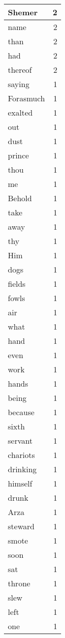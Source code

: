 \begin{center}
\begin{longtable}{l|r}
Shemer & 2\\ \hline 
name & 2\\ \hline 
than & 2\\ \hline 
had & 2\\ \hline 
thereof & 2\\ \hline 
saying & 1\\ \hline 
Forasmuch & 1\\ \hline 
exalted & 1\\ \hline 
out & 1\\ \hline 
dust & 1\\ \hline 
prince & 1\\ \hline 
thou & 1\\ \hline 
me & 1\\ \hline 
Behold & 1\\ \hline 
take & 1\\ \hline 
away & 1\\ \hline 
thy & 1\\ \hline 
Him & 1\\ \hline 
dogs & 1\\ \hline 
fields & 1\\ \hline 
fowls & 1\\ \hline 
air & 1\\ \hline 
what & 1\\ \hline 
hand & 1\\ \hline 
even & 1\\ \hline 
work & 1\\ \hline 
hands & 1\\ \hline 
being & 1\\ \hline 
because & 1\\ \hline 
sixth & 1\\ \hline 
servant & 1\\ \hline 
chariots & 1\\ \hline 
drinking & 1\\ \hline 
himself & 1\\ \hline 
drunk & 1\\ \hline 
Arza & 1\\ \hline 
steward & 1\\ \hline 
smote & 1\\ \hline 
soon & 1\\ \hline 
sat & 1\\ \hline 
throne & 1\\ \hline 
slew & 1\\ \hline 
left & 1\\ \hline 
one & 1\\ \hline 

\end{longtable}
\end{center}
